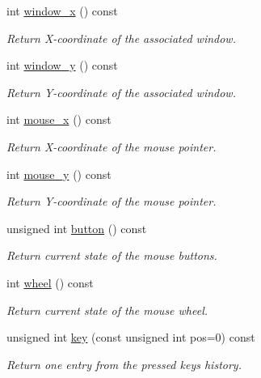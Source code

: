 \begin{DoxyCompactItemize}
int \hyperlink{structcimg__library__suffixed_1_1CImgDisplay_a1c32a0da1d7892afd9e614a5ae79692a}{window\+\_\+x} () const
\begin{DoxyCompactList}\small\item\em Return X-\/coordinate of the associated window. \end{DoxyCompactList}\item 
int \hyperlink{structcimg__library__suffixed_1_1CImgDisplay_ada7f40024566383be680697e9731fde8}{window\+\_\+y} () const
\begin{DoxyCompactList}\small\item\em Return Y-\/coordinate of the associated window. \end{DoxyCompactList}\item 
int \hyperlink{structcimg__library__suffixed_1_1CImgDisplay_aa70a8fffd122d505ff4e3a487c36786a}{mouse\+\_\+x} () const
\begin{DoxyCompactList}\small\item\em Return X-\/coordinate of the mouse pointer. \end{DoxyCompactList}\item 
int \hyperlink{structcimg__library__suffixed_1_1CImgDisplay_a1ffc2df4868b1ab0c3665e0b8175dd07}{mouse\+\_\+y} () const
\begin{DoxyCompactList}\small\item\em Return Y-\/coordinate of the mouse pointer. \end{DoxyCompactList}\item 
unsigned int \hyperlink{structcimg__library__suffixed_1_1CImgDisplay_a78f937ad8000675d0293a8d7e20627fa}{button} () const
\begin{DoxyCompactList}\small\item\em Return current state of the mouse buttons. \end{DoxyCompactList}\item 
int \hyperlink{structcimg__library__suffixed_1_1CImgDisplay_a652c48e6e55a89bc96c9ae24c99a828e}{wheel} () const
\begin{DoxyCompactList}\small\item\em Return current state of the mouse wheel. \end{DoxyCompactList}\item 
unsigned int \hyperlink{structcimg__library__suffixed_1_1CImgDisplay_a8eb7cd4bd6e6593689f82d157caf3ec1}{key} (const unsigned int pos=0) const
\begin{DoxyCompactList}\small\item\em Return one entry from the pressed keys history. \end{DoxyCompactList}\item 

\end{DoxyCompactItemize}
